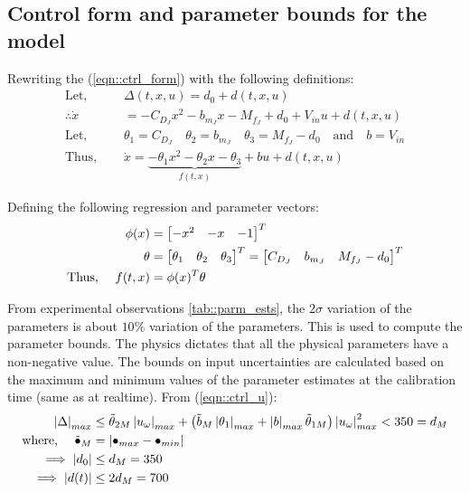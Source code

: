 \subsection{Control form and parameter bounds for the model}

Rewriting the (\ref{eqn::ctrl_form}) with the following definitions:
\begin{align}
    \text{Let, }\quad &\Delta(t, x, u) = d_0 + d(t, x, u) \\
    \therefore \dot x &= -C_{D_J} x^2 -b_{m_J} x - M_{f_J} + d_0 + V_{in} u + d(t, x, u) \\
    \text{Let, } \quad & \theta_1 = C_{D_J} \quad \theta_2 = b_{m_J} \quad \theta_3 = M_{f_J} - d_0  \quad \text{and} \quad b = V_{in}\\
    \text{Thus, }\quad & \dot x = \underbrace{-\theta_1 x^2 -\theta_2 x - \theta_3}_{f(t, x)} + b u + d(t, x, u)
    \label{eqn::prm_ctrl_form}
\end{align}

Defining the following regression and parameter vectors:
\begin{align}
    \phi(x) &= \begin{bmatrix}  -x^2 & -x & -1 \end{bmatrix}^T \\
    \theta &= \begin{bmatrix} \theta_1 & \theta_2 & \theta_3 \end{bmatrix}^T = \begin{bmatrix} C_{D_J} & b_{m_J} & M_{f_J}-d_0 \end{bmatrix}^T \\
    \text{Thus, }\quad f(t, x) &= \phi(x)^T \theta\\
\end{align}

From experimental observations \ref{tab::parm_ests}, the $2\sigma$ variation of
the parameters is about $10\%$ variation of the parameters. This is used to
compute the parameter bounds. The physics dictates that
all the physical parameters have a non-negative value. The bounds on input
uncertainties are calculated based on the maximum and minimum values of the
parameter estimates at the calibration time (same as at realtime). From (\ref{eqn::ctrl_u}):
\begin{align*}
    \left\lvert \Delta \right\rvert_{max} &\leq \tilde \theta_{2M} \left\lvert u_\omega \right\rvert_{max} + \left( \tilde b_M \left\lvert \theta_1 \right\rvert_{max} + \left\lvert b \right\rvert_{max} \tilde \theta_{1M} \right)\left\lvert u_\omega \right\rvert_{max}^2  < 350 = d_M\\
    \text{where, }\quad \tilde \bullet_M &= \left\lvert \bullet_{max} - \bullet_{min} \right\rvert\\
    \implies \left\lvert d_0 \right\rvert &\leq d_M = 350 \\
    \implies \left\lvert d(t) \right\rvert &\leq 2 d_M = 700
\end{align*}




